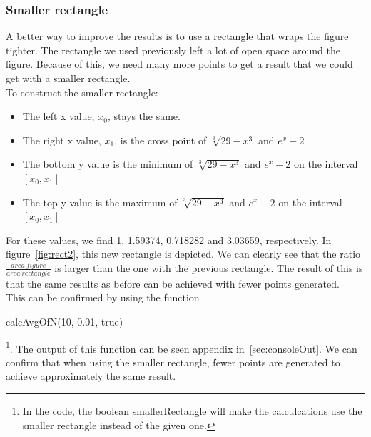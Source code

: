 \documentclass[11pt, a4paper, titlepage, openright]{article}
\begin{document}
        \subsubsection{Smaller rectangle}
            A better way to improve the results is to use a rectangle that wraps the figure tighter. The rectangle we used previously left a lot of open 
            space around the figure. Because of this, we need many more points to get a result that we could get with a smaller rectangle. \\
            To construct the smaller rectangle:
            \begin{itemize}
                \item The left x value, \(x_0\), stays the same.
                \item The right x value, \(x_1\), is the cross point of \( \sqrt[3]{29 - x^3} \) and \( e^x -2 \)
                \item The bottom y value is the minimum of \( \sqrt[3]{29 - x^3} \) and \( e^x -2 \) on the interval \([x_0, x_1]\)
                \item The top y value is the maximum of \( \sqrt[3]{29 - x^3} \) and \( e^x -2 \) on the interval \([x_0, x_1]\)
            \end{itemize}
            For these values, we find 1, 1.59374, 0.718282 and 3.03659, respectively. 
            \newpage
            In figure~\ref{fig:rect2}, this new rectangle is depicted.
            We can clearly see that the ratio \(\frac{area\ figure}{area\ rectangle}\) is larger than the one with the previous rectangle. The result of
            this is that the same results as before can be achieved with fewer points generated.  \\
            This can be confirmed by using the function \begin{mbox}calcAvgOfN(10, 0.01, true)\end{mbox}\footnote{In the code, the boolean smallerRectangle will make the calculcations use
            the smaller rectangle instead of the given one.}. The output of this function can be seen appendix in~\ref{sec:consoleOut}. We can confirm that 
            when using the smaller rectangle, fewer points are generated to achieve approximately the same result.
            
\end{document}
